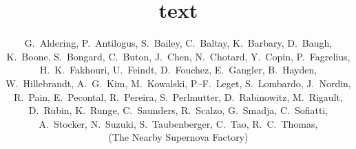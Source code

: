 \documentclass{aastex}   	%
\begin{document}
\title{text}
\author
{
    G.~Aldering,
    P.~Antilogus,
    S.~Bailey,
    C.~Baltay,
    K.~Barbary,
    D.~Baugh,
    K.~Boone,
    S.~Bongard,
    C.~Buton,
    J.~Chen,
    N.~Chotard,
    Y.~Copin,
    P.~Fagrelius,
    H.~K.~Fakhouri,
    U.~Feindt,
    D.~Fouchez,
    E.~Gangler,  
    B.~Hayden,
    W.~Hillebrandt,
    A.~G.~Kim,
    M.~Kowalski,
    P.-F.~Leget,
    S.~Lombardo,
    J.~Nordin,
    R.~Pain, 
    E.~Pecontal,
    R.~Pereira,
    S.~Perlmutter,
    D.~Rabinowitz,
    M.~Rigault, 
    D.~Rubin,
    K.~Runge,
    C.~Saunders,
   R.~Scalzo,
    G.~Smadja, 
    C.~Sofiatti, 
    A.~Stocker,
    N.~Suzuki,
    S.~Taubenberger,
    C.~Tao,
    R.~C.~Thomas, \\
    (The Nearby Supernova Factory)
}
\end{document}
